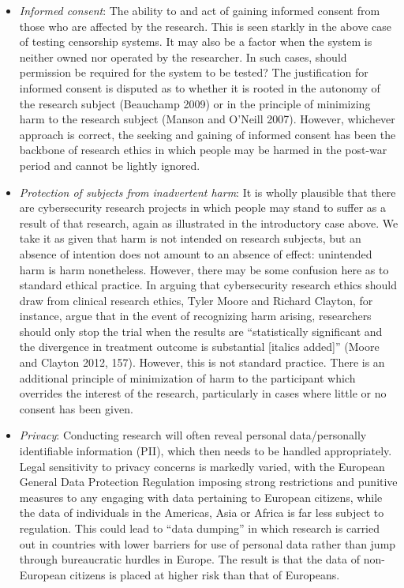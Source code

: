 \documentclass{svjour3}                     %
\begin{document}
\begin{itemize}
\item \emph{Informed consent}:
The ability to and act of gaining informed consent from those who are affected by the research.  This is seen starkly in the above case of testing censorship systems. It may also be a factor when the system is neither owned nor operated by the researcher. In such cases, should permission be required for the system to be tested?
The justification for informed consent is disputed as to whether it is rooted in the autonomy of the research subject (Beauchamp 2009) or in the principle of minimizing harm to the research subject (Manson and O’Neill 2007). However, whichever approach is correct, the seeking and gaining of informed consent has been the backbone of research ethics in which people may be harmed in the post-war period and cannot be lightly ignored.
\item \emph{Protection of subjects from inadvertent harm}:
It is wholly plausible that there are cybersecurity research projects in which people may stand to suffer as a result of that research, again as illustrated in the introductory case above. We take it as given that harm is not intended on research subjects, but an absence of intention does not amount to an absence of effect: unintended harm is harm nonetheless. However, there may be some confusion here as to standard ethical practice. In arguing that cybersecurity research ethics should draw from clinical research ethics, Tyler Moore and Richard Clayton, for instance, argue that in the event of recognizing harm arising, researchers should only stop the trial when the results are “statistically significant and the divergence in treatment outcome is substantial [italics added]” (Moore and Clayton 2012, 157). However, this is not standard practice. There is an additional principle of minimization of harm to the participant which overrides the interest of the research, particularly in cases where little or no consent has been given.
\item \emph{Privacy}:
Conducting research will often reveal personal data/personally identifiable information (PII), which then needs to be handled appropriately. Legal sensitivity to privacy concerns is markedly varied, with the European General Data Protection Regulation imposing strong restrictions and punitive measures to any engaging with data pertaining to European citizens, while the data of individuals in the Americas, Asia or Africa is far less subject to regulation. This could lead to “data dumping” in which research is carried out in countries with lower barriers for use of personal data rather than jump through bureaucratic hurdles in Europe.  The result is that the data of non-European citizens is placed at higher risk than that of Europeans.


\end{itemize}
\end{document}
